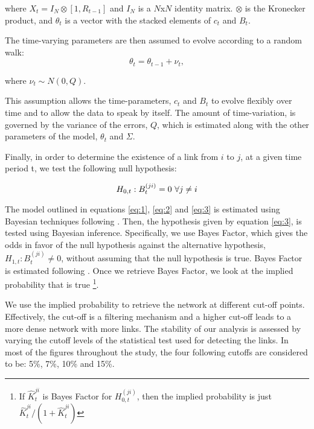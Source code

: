 \documentclass[a4paper,10pt]{article}
\begin{document}
\noindent where $X_t= I_N \otimes [1,R_{t-1}]$ and $I_N$ is a $N$x$N$ identity matrix. $\otimes$  is the Kronecker product,
and $\theta_t$ is a vector with the stacked elements of $c_t$ and $B_t$.

The time-varying parameters are then assumed to evolve according to a random walk:
\begin{equation}
\theta_t= \theta_{t-1} + \nu_t,
\label{eq:3}
\end{equation} 

\noindent where $\nu_t \sim N(0,Q)$.

This assumption allows the time-parameters, $c_t$ and $B_t$ to evolve flexibly over time and to allow the data to speak 
by itself. The amount of time-variation, is governed by the variance of the errors, $Q$, which is estimated along with 
the other parameters of the model, $\theta_t$ and $\Sigma$. 

Finally, in order to determine the existence of a link from $i$ to $j$, at a given time period t, we test the following null
hypothesis:

\begin{equation}
H_{0,t}:B^{(ji)}_{t}=0 \ \forall j \neq i \\ 
\label{eq:4}
\end{equation}

The model outlined in equations \ref{eq:1}, \ref{eq:2} and \ref{eq:3} is estimated using Bayesian techniques following
\cite{Calomiris}. Then, the hypothesis given by equation \ref{eq:3}, is tested using Bayesian inference. Specifically, we use 
Bayes Factor, which gives the odds in favor of the null hypothesis against the alternative hypothesis, 
$H_{1,t}:B^{(ji)}_{t} \ne 0$, without assuming that the null hypothesis is true. Bayes Factor is estimated following \cite{Koop}. Once we retrieve Bayes Factor, we look at the implied probability that  is
true \footnote{If $\hat{K}^{ji}_{t}$ is Bayes Factor for $H^{(ji)}_{0,t}$, then the implied probability is just 
$\hat{K}^{ji}_{t} / (1+\hat{K}^{ji}_{t})$}.

We use the implied probability to retrieve the network at different cut-off points. Effectively, the cut-off is a filtering 
mechanism and a higher cut-off leads to a more dense network with more links. The stability of our analysis is assessed by 
varying the cutoff levels of the statistical test used for detecting the links. In most of the figures throughout the study,
the four following cutoffs are considered to be: 5\%, 7\%, 10\% and 15\%. 
\end{document}
